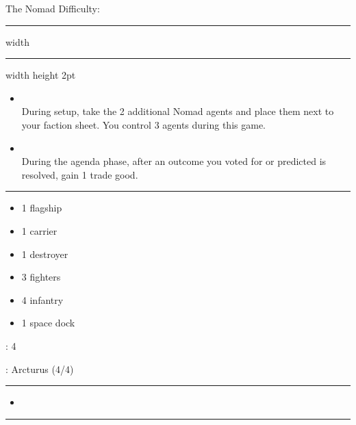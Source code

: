 {\handel\Huge The Nomad} \hfill {\Large Difficulty: \easy} \vspace{-4pt}\\
\hrule width \hsize \kern 1mm \hrule width \hsize height 2pt


\begin{multicols}{2}


\begin{itemize}
\item {}\\
During setup, take the 2 additional Nomad agents and place them next to your faction sheet. You control 3 agents during this game.
\item {}\\
During the agenda phase, after an outcome you voted for or predicted is resolved, gain 1 trade good.
\end{itemize}


\vspace{-10pt}\rule{\hsize}{0.4pt}\vspace{5pt}


\vspace{-5pt}
\begin{multicols}{2}
\begin{itemize}
\item 1 flagship
\item 1 carrier
\item 1 destroyer
\item 3 fighters
\item 4 infantry
\item 1 space dock
\end{itemize}
\end{multicols}

\vspace{-5pt}
: 4

\vspace{2pt}
: Arcturus (4/4)

\rule{\hsize}{0.4pt}\vspace{5pt}


\begin{itemize}
\item \sling
\end{itemize}

\vspace{-10pt}\rule{\hsize}{0.4pt}\vspace{5pt}


\end{multicols}
